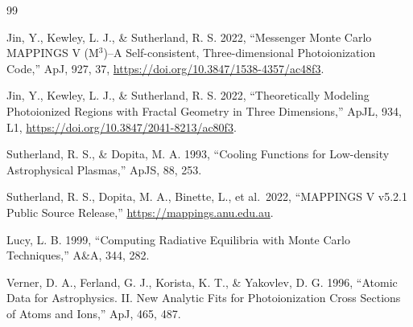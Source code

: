 \documentclass[english,a4paper]{my_memo}
\begin{document}
\begin{thebibliography}{99}

Jin, Y., Kewley, L. J., \& Sutherland, R. S. 2022,
``Messenger Monte Carlo MAPPINGS V (M$^3$)--A Self-consistent,
Three-dimensional Photoionization Code,'' ApJ, 927, 37,
\url{https://doi.org/10.3847/1538-4357/ac48f3}.

Jin, Y., Kewley, L. J., \& Sutherland, R. S. 2022,
``Theoretically Modeling Photoionized Regions with Fractal Geometry in
Three Dimensions,'' ApJL, 934, L1,
\url{https://doi.org/10.3847/2041-8213/ac80f3}.

Sutherland, R. S., \& Dopita, M. A. 1993,
``Cooling Functions for Low-density Astrophysical Plasmas,'' ApJS, 88, 253.

Sutherland, R. S., Dopita, M. A., Binette, L., et al.\ 2022,
``MAPPINGS V v5.2.1 Public Source Release,''
\url{https://mappings.anu.edu.au}.

Lucy, L. B. 1999, ``Computing Radiative Equilibria with Monte Carlo
Techniques,'' A\&A, 344, 282.

Verner, D. A., Ferland, G. J., Korista, K. T., \& Yakovlev, D. G. 1996,
``Atomic Data for Astrophysics. II. New Analytic Fits for Photoionization
Cross Sections of Atoms and Ions,'' ApJ, 465, 487.

\end{thebibliography}
\end{document}
